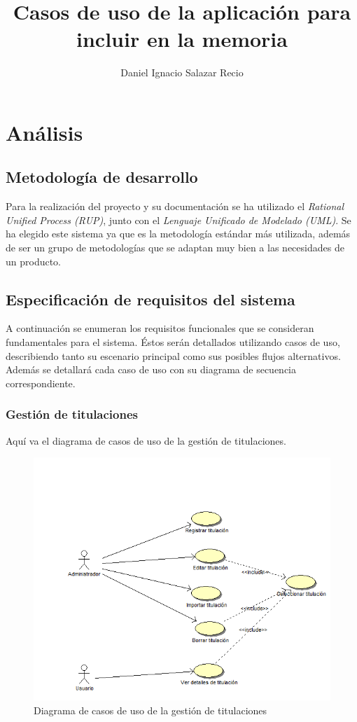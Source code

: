 \documentclass{book}
\title{Casos de uso de la aplicación para incluir en la memoria}
\author{Daniel Ignacio Salazar Recio}
\begin{document}
\maketitle
\chapter{Análisis}
\section{Metodología de desarrollo}
Para la realización del proyecto y su documentación se ha utilizado el {\em Rational Unified Process (RUP)}, junto con el {\em Lenguaje Unificado de Modelado (UML)}. Se ha elegido este sistema ya que es la metodología estándar más utilizada, además de ser un grupo de metodologías que se adaptan muy bien a las necesidades de un producto.

\section{Especificación de requisitos del sistema}
A continuación se enumeran los requisitos funcionales que se consideran fundamentales para el sistema. Éstos serán detallados utilizando casos de uso, describiendo tanto su escenario principal como sus posibles flujos alternativos. Además se detallará cada caso de uso con su diagrama de secuencia correspondiente.


\subsection{Gestión de titulaciones}
 Aquí va el diagrama de casos de uso de la gestión de titulaciones.

\begin{figure}[H] 
  \label{gestion-titulaciones} 
	\begin{center}
    \includegraphics[scale=0.5]{./gestiontitulaciones.png}
  \end{center}
\caption{Diagrama de casos de uso de la gestión de titulaciones}
\end{figure}
\end{document}
